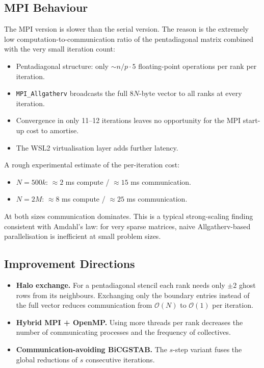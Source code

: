 \documentclass[11pt,a4paper]{article}
\begin{document}
\subsection{MPI Behaviour}

The MPI version is slower than the serial version. The reason is the
extremely low computation-to-communication ratio of the pentadiagonal
matrix combined with the very small iteration count:

\begin{itemize}
    \item Pentadiagonal structure: only $\sim n/p \cdot 5$
          floating-point operations per rank per iteration.
    \item \texttt{MPI\_Allgatherv} broadcasts the full $8N$-byte
          vector to all ranks at every iteration.
    \item Convergence in only 11--12 iterations leaves no opportunity
          for the MPI start-up cost to amortise.
    \item The WSL2 virtualisation layer adds further latency.
\end{itemize}

\noindent A rough experimental estimate of the per-iteration cost:
\begin{itemize}
    \item $N = 500k$: $\approx 2$ ms compute / $\approx 15$ ms communication.
    \item $N = 2M$: $\approx 8$ ms compute / $\approx 25$ ms communication.
\end{itemize}

\noindent At both sizes communication dominates. This is a typical
strong-scaling finding consistent with Amdahl's law: for very sparse
matrices, naive Allgatherv-based parallelisation is inefficient at
small problem sizes.

\subsection{Improvement Directions}

\begin{itemize}
    \item \textbf{Halo exchange.} For a pentadiagonal stencil each
          rank needs only $\pm 2$ ghost rows from its neighbours.
          Exchanging only the boundary entries instead of the full
          vector reduces communication from $\mathcal{O}(N)$ to
          $\mathcal{O}(1)$ per iteration.
    \item \textbf{Hybrid MPI + OpenMP.} Using more threads per rank
          decreases the number of communicating processes and the
          frequency of collectives.
    \item \textbf{Communication-avoiding BiCGSTAB.} The $s$-step
          variant fuses the global reductions of $s$ consecutive
          iterations.
\end{itemize}
\end{document}
